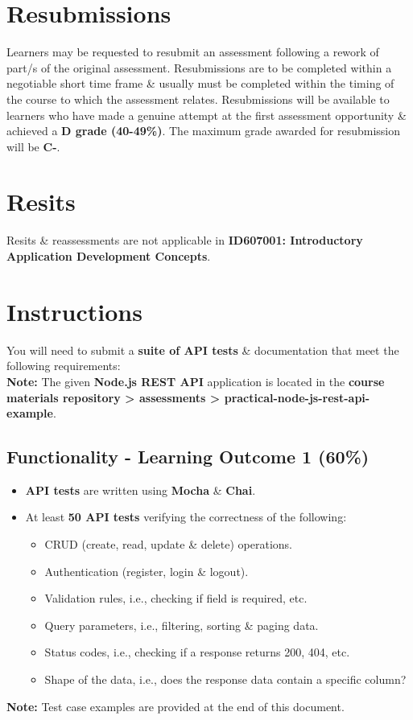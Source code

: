 \documentclass{article}
\begin{document}
\section*{Resubmissions}
Learners may be requested to resubmit an assessment following a rework of part/s of the original assessment. Resubmissions are to be completed within a negotiable short time frame \& usually must be completed within the timing of the course to which the assessment relates. Resubmissions will be available to learners who have made a genuine attempt at the first assessment opportunity \& achieved a \textbf{D grade (40-49\%)}. The maximum grade awarded for resubmission will be \textbf{C-}.

\section*{Resits}
Resits \& reassessments are not applicable in \textbf{ID607001: Introductory Application Development Concepts}. 

\newpage

\section*{Instructions}
You will need to submit a \textbf{suite of API tests} \& documentation that meet the following requirements: \\

\textbf{Note:} The given \textbf{Node.js REST API} application is located in the \textbf{course materials repository > assessments > practical-node-js-rest-api-example}.

\subsection*{Functionality - Learning Outcome 1 (60\%)}
\begin{itemize}
    \item \textbf{API tests} are written using \textbf{Mocha} \& \textbf{Chai}.
    \item At least \textbf{50 API tests} verifying the correctness of the following:
          \begin{itemize}
            \item CRUD (create, read, update \& delete) operations.
            \item Authentication (register, login \& logout).
            \item Validation rules, i.e., checking if field is required, etc.
            \item Query parameters, i.e., filtering, sorting \& paging data.
            \item Status codes, i.e., checking if a response returns 200, 404, etc.
            \item Shape of the data, i.e., does the response data contain a specific column?
          \end{itemize}
\end{itemize}
\textbf{Note:} Test case examples are provided at the end of this document.
\end{document}

